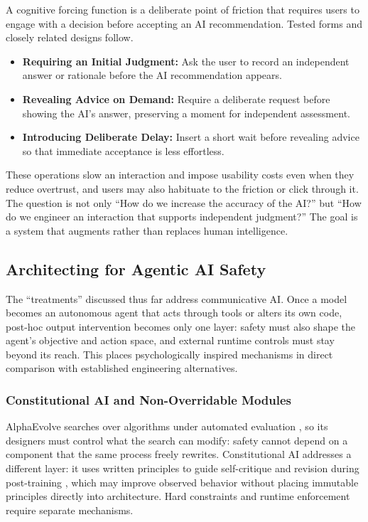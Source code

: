 \documentclass{article}
\begin{document}
A cognitive forcing function is a deliberate point of friction that requires users to engage with a decision before accepting an AI recommendation. Tested forms and closely related designs follow.
\begin{itemize}
    \item \textbf{Requiring an Initial Judgment:} Ask the user to record an independent answer or rationale before the AI recommendation appears.
    \item \textbf{Revealing Advice on Demand:} Require a deliberate request before showing the AI's answer, preserving a moment for independent assessment.
    \item \textbf{Introducing Deliberate Delay:} Insert a short wait before revealing advice so that immediate acceptance is less effortless.
\end{itemize}
These operations slow an interaction and impose usability costs even when they reduce overtrust, and users may also habituate to the friction or click through it. The question is not only ``How do we increase the accuracy of the AI?'' but ``How do we engineer an interaction that supports independent judgment?'' The goal is a system that augments rather than replaces human intelligence.

\subsection{Architecting for Agentic AI Safety}
The ``treatments'' discussed thus far address communicative AI. Once a model becomes an autonomous agent that acts through tools or alters its own code, post-hoc output intervention becomes only one layer: safety must also shape the agent's objective and action space, and external runtime controls must stay beyond its reach. This places psychologically inspired mechanisms in direct comparison with established engineering alternatives.

\subsubsection{Constitutional AI and Non-Overridable Modules}
AlphaEvolve searches over algorithms under automated evaluation \citep{ref39}, so its designers must control what the search can modify: safety cannot depend on a component that the same process freely rewrites. Constitutional AI addresses a different layer: it uses written principles to guide self-critique and revision during post-training \citep{ref27}, which may improve observed behavior without placing immutable principles directly into architecture. Hard constraints and runtime enforcement require separate mechanisms.
\end{document}
